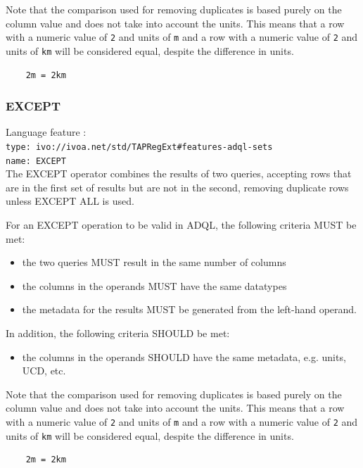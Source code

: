 \documentclass[11pt,a4paper]{ivoa}
\begin{document}
Note that the comparison used for removing duplicates is based purely on the
column value and does not take into account the units.
This means that a row with a numeric value of \verb:2: and units of \verb:m:
and a row with a numeric value of \verb:2: and units of \verb:km: will be
considered equal, despite the difference in units.
\begin{verbatim}
    2m = 2km
\end{verbatim}

\subsubsection{EXCEPT}
{\footnotesize Language feature :}\\
{\footnotesize \verb|type: ivo://ivoa.net/std/TAPRegExt#features-adql-sets|}\\
{\footnotesize \verb|name: EXCEPT|}\\

The EXCEPT operator combines the results of two queries, accepting rows that are
in the first set of results but are not in the second,
removing duplicate rows unless EXCEPT ALL is used.

For an EXCEPT operation to be valid in ADQL, the following criteria MUST be met:

\begin{itemize}
    \item the two queries MUST result in the same number of columns
    \item the columns in the operands MUST have the same datatypes
    \item the metadata for the results MUST be generated from the left-hand operand.
\end{itemize}

In addition, the following criteria SHOULD be met: 
\begin{itemize}
    \item the columns in the operands SHOULD have the same metadata, e.g. units, UCD, etc.
\end{itemize}

Note that the comparison used for removing duplicates is based purely on the
column value and does not take into account the units.
This means that a row with a numeric value of \verb:2: and units of \verb:m:
and a row with a numeric value of \verb:2: and units of \verb:km: will be
considered equal, despite the difference in units.
\begin{verbatim}
    2m = 2km
\end{verbatim}
\end{document}
